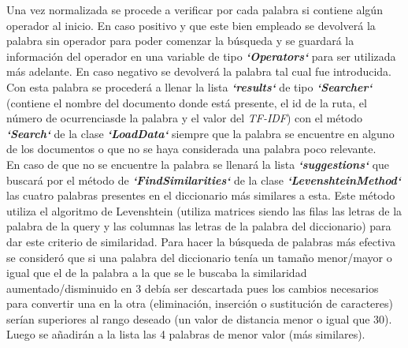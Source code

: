 \documentclass{article}
\begin{document}
\begin{flushleft}
{Una vez normalizada se procede a verificar por cada palabra si contiene algún operador 
al inicio. En caso positivo y que este bien empleado se devolverá la palabra sin operador 
para poder comenzar la búsqueda y se guardará la información del operador en una 
variable de tipo \textbf{\textit{`Operators`}} para ser utilizada más adelante. En caso negativo se 
devolverá la palabra tal cual fue introducida.\linebreak \\

Con esta palabra se procederá a llenar la lista \textbf{\textit{`results`}} de tipo \textbf{\textit{`Searcher`}} (contiene el nombre del documento donde está presente, el id de la ruta, el número de ocurrenciasde la palabra y el valor del \textit{ TF-IDF}) con el método \textbf{\textit{`Search`}} de la clase \textbf{\textit{`LoadData`}} siempre que la palabra se encuentre en alguno de los documentos o que no se haya considerada una palabra poco relevante. \linebreak \\

En caso de que no se encuentre la palabra se llenará la lista \textbf{\textit{`suggestions`}} que buscará
por el método de \textbf{\textit{`FindSimilarities`}} de la clase \textbf{\textit{`LevenshteinMethod`}} las cuatro palabras presentes en el diccionario más similares a esta. Este método utiliza el algoritmo de 
Levenshtein (utiliza matrices siendo las filas las letras de la palabra de la query y las 
columnas las letras de la palabra del diccionario) para dar este criterio de similaridad. 
Para hacer la búsqueda de palabras más efectiva se consideró que si una palabra del 
diccionario tenía un tamaño menor/mayor o igual que el de la palabra a la que se le 
buscaba la similaridad aumentado/disminuido en 3 debía ser descartada pues los 
cambios necesarios para convertir una en la otra (eliminación, inserción o sustitución de 
caracteres) serían superiores al rango deseado (un valor de distancia menor o igual que 
30). Luego se añadirán a la lista las 4 palabras de menor valor (más similares).\linebreak \\

}
\end{flushleft}
\end{document}
